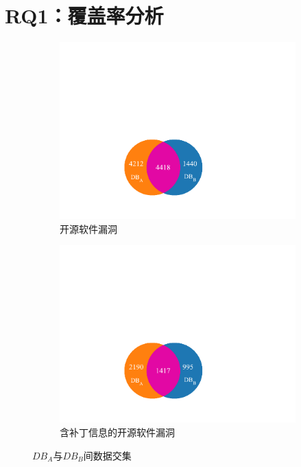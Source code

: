 \section{RQ1：覆盖率分析}\label{sec:coverage}
\begin{figure}[h]
    \centering
    \begin{subfigure}[b]{0.45\textwidth}
    \centering
    \includegraphics[scale=0.98]{res/rq1-CVE-IDs-VS.pdf}
    \caption{开源软件漏洞}\label{fig:rq1-cves}
    \end{subfigure}
    \begin{subfigure}[b]{0.45\textwidth}
    \centering
    \includegraphics[scale=0.98]{res/rq1-CVE-IDs-Patches-VS.pdf}
    \caption{含补丁信息的开源软件漏洞}\label{fig:rq1-cves-with-patches}
    \end{subfigure}
    \caption{$DB_A$与$DB_B$间数据交集}\label{fig:intersection}
\end{figure}


